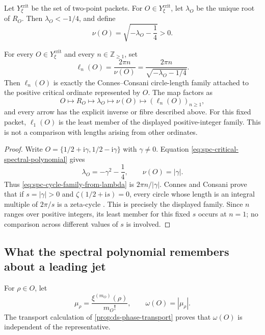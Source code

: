 Let \(Y_\xi^{\mathrm{crit}}\) be the set of two-point packets.  For
\(O\in Y_\xi^{\mathrm{crit}}\), let \(\lambda_O\) be the unique root of
\(R_O\).  Then \(\lambda_O<-1/4\), and define
\begin{equation}
\label{eq:spc-critical-frequency-from-lambda}
 \nu(O)=\sqrt{-\lambda_O-\frac14}>0.
\end{equation}

\begin{proposition}
\label{prop:spc-critical-cycle-factor}
For every \(O\in Y_\xi^{\mathrm{crit}}\) and every
\(n\in\mathbb Z_{\geq1}\), set
\begin{equation}
\label{eq:spc-cycle-family-from-lambda}
 \ell_n(O)
 =
 \frac{2\pi n}{\nu(O)}
 =
 \frac{2\pi n}{\sqrt{-\lambda_O-1/4}}.
\end{equation}
Then \(\ell_n(O)\) is exactly the Connes--Consani circle-length family
attached to the positive critical ordinate represented by \(O\).  The map
factors as
\[
 O\longmapsto R_O
 \longmapsto\lambda_O
 \longmapsto\nu(O)
 \longmapsto(\ell_n(O))_{n\geq1},
\]
and every arrow has the explicit inverse or fibre described above.  For this
fixed packet, \(\ell_1(O)\) is the least member of the displayed
positive-integer family.  This is not a comparison with lengths arising from
other ordinates.
\end{proposition}

\begin{proof}
Write
\(O=\{1/2+\mathrm i\gamma,1/2-\mathrm i\gamma\}\) with
\(\gamma\ne0\).  Equation
\eqref{eq:spc-critical-spectral-polynomial} gives
\[
 \lambda_O=-\gamma^2-\frac14,
 \qquad
 \nu(O)=|\gamma|.
\]
Thus \eqref{eq:spc-cycle-family-from-lambda} is
\(2\pi n/|\gamma|\).  Connes and Consani prove that if
\(s=|\gamma|>0\) and \(\zeta(1/2+\mathrm is)=0\), every circle whose length
is an integral multiple of \(2\pi/s\) is a zeta-cycle
\cite[Thm.~6.4(ii)]{connesConsani2021ZetaCycles}.  This is precisely the
displayed family.  Since \(n\) ranges over positive integers, its least member
for this fixed \(s\) occurs at \(n=1\); no comparison across different
values of \(s\) is involved.
\end{proof}

\subsection{What the spectral polynomial remembers about a leading jet}

For \(\rho\in O\), let
\[
 \mu_\rho=\frac{\xi^{(m_O)}(\rho)}{m_O!},
 \qquad
 \omega(O)=|\mu_\rho|.
\]
The transport calculation of \cref{prop:ds-phase-transport} proves that
\(\omega(O)\) is independent of the representative.


